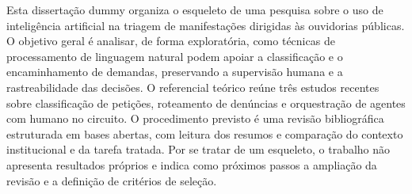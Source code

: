 \begin{resumo}
Esta dissertação dummy organiza o esqueleto de uma pesquisa sobre o uso de inteligência artificial na triagem de manifestações dirigidas às ouvidorias públicas. O objetivo geral é analisar, de forma exploratória, como técnicas de processamento de linguagem natural podem apoiar a classificação e o encaminhamento de demandas, preservando a supervisão humana e a rastreabilidade das decisões. O referencial teórico reúne três estudos recentes sobre classificação de petições, roteamento de denúncias e orquestração de agentes com humano no circuito. O procedimento previsto é uma revisão bibliográfica estruturada em bases abertas, com leitura dos resumos e comparação do contexto institucional e da tarefa tratada. Por se tratar de um esqueleto, o trabalho não apresenta resultados próprios e indica como próximos passos a ampliação da revisão e a definição de critérios de seleção.
\end{resumo}
